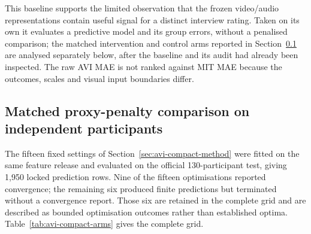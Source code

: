 This baseline supports the limited observation that the frozen video/audio
representations contain useful signal for a distinct interview rating. Taken on its own it
evaluates a predictive model and its group errors, without a penalised comparison; the
matched intervention and control arms reported in
Section~\ref{sec:avi-compact-results} are analysed separately below, after the baseline
and its audit had already been inspected. The raw AVI MAE is not ranked
against MIT MAE because the outcomes, scales and visual input boundaries differ.

\subsection{Matched proxy-penalty comparison on independent participants}
\label{sec:avi-compact-results}

The fifteen fixed settings of Section~\ref{sec:avi-compact-method} were fitted on the same
feature release and evaluated on the official 130-participant test, giving 1{,}950 locked
prediction rows. Nine of the fifteen optimisations reported convergence; the remaining six
produced finite predictions but terminated without a convergence report. Those six are
retained in the complete grid and are described as bounded optimisation outcomes rather
than established optima. Table~\ref{tab:avi-compact-arms} gives the complete grid.

